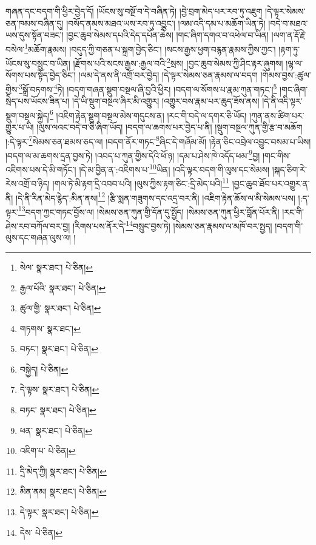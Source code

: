 གཞན་དང་བདག་གི་ཕྱིར་བྱེད་དོ། །ཡོངས་སུ་བསྔོ་བ་དེ་བཞིན་ཏེ། །བྱེ་བྲག་མེད་པར་རབ་ཏུ་འཇུག །དེ་ལྟར་སེམས་ཅན་ཁམས་བཞིན་དུ། །བསོད་ནམས་མཐའ་ཡས་རབ་ཏུ་འབྱུང་། །ལམ་འདི་དམ་པ་མཆོག་ཡིན་ཏེ། །བདེ་བ་མཐའ་ཡས་དུས་སྟོན་བཟང་། །བྱང་ཆུབ་སེམས་དཔའི་དེད་དཔོན་ཆེས། །གང་ཞིག་དགའ་བ་འཕེལ་བ་ཡིན། །ལག་ན་རྡོ་རྗེ་བསེལ་\footnote{སེལ་  སྣར་ཐང་།  པེ་ཅིན། }མཆོག་རྣམས། །བདུད་ཀྱི་གཅན་པ་སྐྲག་བྱེད་ཅིང་། །སངས་རྒྱས་ཕྱག་བརྙན་རྣམས་ཀྱིས་ཀྱང་། །རྟག་ཏུ་ཡོངས་སུ་བསྲུང་བ་ཡིན། །རྫོགས་པའི་སངས་རྒྱས་:རྒྱལ་བའི་\footnote{རྒྱལ་པོའི་  སྣར་ཐང་།  པེ་ཅིན། }སྲས། །བྱང་ཆུབ་སེམས་ཀྱི་ཤིང་རྟར་ཞུགས། །ལྷ་ལ་སོགས་པས་སྟོད་བྱེད་ཅིང་། །ལམ་དེ་ནས་ནི་འགྲོ་བར་བྱེད། །དེ་ལྟར་སེམས་ཅན་རྣམས་ལ་བདག །གོམས་བྱས་:ཚུལ་གྱིས་\footnote{ཚུལ་གྱི་  སྣར་ཐང་།  པེ་ཅིན། }སྒྲོ་བཏགས་\footnote{གཏགས་  སྣར་ཐང་། }ཏེ། །བདག་གཞན་སྡུག་བསྔལ་ཞི་བྱའི་ཕྱིར། །བདག་ལ་སོགས་པ་རྣམ་ཀུན་གཏང་།\footnote{བཏང་།  སྣར་ཐང་།  པེ་ཅིན། } །གང་ཞིག་སྲེད་པས་ཡོངས་ཟིན་པ། །དེ་ཡི་སྡུག་བསྔལ་ཞིར་མི་འགྱུར། །འགྱུར་བས་རྣམ་པར་ཆུད་ཟོས་ནས། །དེ་ནི་འདི་ལྟར་སྡུག་བསྔལ་སྐྱེད།\footnote{བསྐྱེད།  པེ་ཅིན། } །འཇིག་རྟེན་སྡུག་བསྔལ་མེས་གདུངས་ན། །རང་གི་བདེ་ལ་དགར་ཅི་ཡོད། །ཀུན་ནས་ཚིག་པར་གྱུར་པ་ཡི། །ལུས་ལའང་བདེ་བ་ཅི་ཞིག་ཡོད། །བདག་ལ་ཆགས་པར་བྱེད་པ་ནི། །སྡུག་བསྔལ་ཀུན་གྱི་རྩ་བ་མཆོག །:དེ་ལྟར་\footnote{དེ་ལྟས་  སྣར་ཐང་།  པེ་ཅིན། }སེམས་ཅན་ཐམས་ཅད་ལ། །བདག་ནོར་གཏང་\footnote{བཏང་  སྣར་ཐང་།  པེ་ཅིན། }ཞིང་དེ་གཞོམ་མོ། །རྟེན་ཅིང་འབྲེལ་འབྱུང་བསམ་པ་ཡིས། །བདག་ལ་མ་ཆགས་དྲན་བྱས་ཏེ། །འབད་པ་ཀུན་གྱིས་དེའི་ཕོ་ཉ། །དམ་པ་ཤེས་ཁེ་འདོད་ཕམ་\footnote{ཕན་  སྣར་ཐང་།  པེ་ཅིན། }བྱ། །གང་གིས་འཇིགས་པས་དེ་མི་གཏོང་། །དེ་མ་བྱིན་ན་:འཇིགས་པ་\footnote{འཇིག་པ་  པེ་ཅིན། }ཡིན། །འདི་ལྟར་བདག་གི་ལུས་དང་སེམས། །སྐད་ཅིག་རེ་རེས་འགྲོ་བ་ཉིད། །གལ་ཏེ་མི་རྟག་དྲི་འབབ་པའི། །ལུས་ཀྱིས་རྟག་ཅིང་:དྲི་མེད་པའི།\footnote{དྲི་མེད་ཀྱི།  སྣར་ཐང་།  པེ་ཅིན། } །བྱང་ཆུབ་ཐོབ་པར་འགྱུར་ན་ནི། །དེ་ནི་རིན་མེད་རྙེད་:མིན་ནས།\footnote{མིན་ནམ།  སྣར་ཐང་།  པེ་ཅིན། } །རྩི་སྨན་གཟུགས་དང་འདྲ་བར་ནི། །འཇིག་རྟེན་ཆོས་ལ་མི་སེམས་པས། །:ད་ལྟར་\footnote{དེ་ལྟར་  སྣར་ཐང་།  པེ་ཅིན། }བདག་ཀྱང་གཏང་བྱོས་ལ། །སེམས་ཅན་ཀུན་གྱི་དོན་དུ་སྤྱོད། །སེམས་ཅན་ཀུན་ཕྱིར་བློན་པོར་ནི། །རང་གི་ཤེས་རབ་བཀོལ་བར་བྱ། །རིགས་པས་ནོར་དེ་\footnote{དེས་  པེ་ཅིན། }བསྲུང་བྱས་ཏེ། །སེམས་ཅན་རྣམས་ལ་མཁོ་བར་སྤྱད། །བདག་གི་ལུས་དང་གཞན་ལུས་ལ། །
